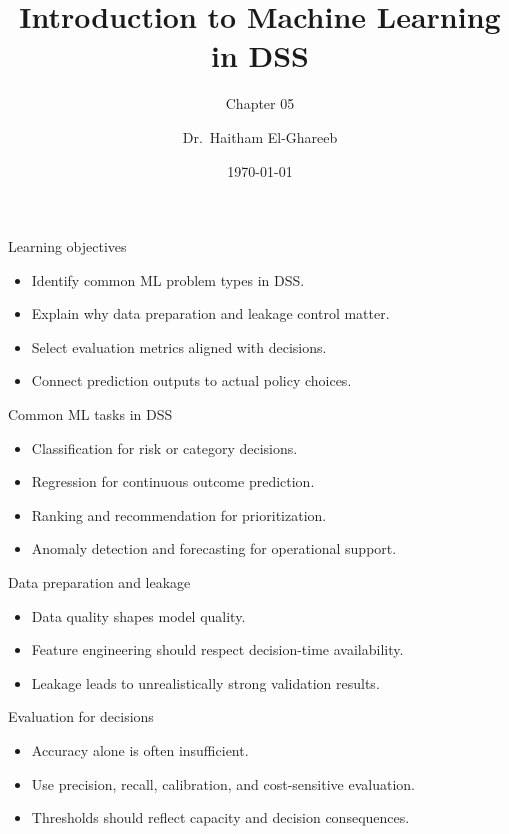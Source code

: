 \documentclass[aspectratio=169,11pt]{beamer}
\title[ML in DSS]{Introduction to Machine Learning in DSS}
\subtitle{Chapter 05}
\author{Dr.\ Haitham El-Ghareeb}
\institute{Faculty of Computers and Information Sciences}
\date{\today}
\begin{document}
\begin{frame}
  \titlepage
\end{frame}

\begin{frame}{Learning objectives}
  \begin{itemize}
    \item Identify common ML problem types in DSS.
    \item Explain why data preparation and leakage control matter.
    \item Select evaluation metrics aligned with decisions.
    \item Connect prediction outputs to actual policy choices.
  \end{itemize}
\end{frame}

\begin{frame}{Common ML tasks in DSS}
  \begin{itemize}
    \item Classification for risk or category decisions.
    \item Regression for continuous outcome prediction.
    \item Ranking and recommendation for prioritization.
    \item Anomaly detection and forecasting for operational support.
  \end{itemize}
\end{frame}

\begin{frame}{Data preparation and leakage}
  \begin{itemize}
    \item Data quality shapes model quality.
    \item Feature engineering should respect decision-time availability.
    \item Leakage leads to unrealistically strong validation results.
  \end{itemize}
\end{frame}

\begin{frame}{Evaluation for decisions}
  \begin{itemize}
    \item Accuracy alone is often insufficient.
    \item Use precision, recall, calibration, and cost-sensitive evaluation.
    \item Thresholds should reflect capacity and decision consequences.
  \end{itemize}
\end{frame}
\end{document}
